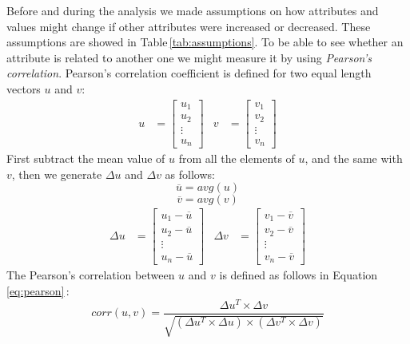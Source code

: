 \documentclass[USenglish]{uit-thesis}
\begin{document}
Before and during the analysis we made assumptions on how
attributes and values might change if other attributes were
increased or decreased. These assumptions are showed
in Table\,\ref{tab:assumptions}. To be able to see whether
an attribute is related to another one we might
measure it by using \emph{Pearson's correlation}.
Pearson's correlation coefficient is defined for two equal
length vectors $u$ and $v$:
\begin{align}
u &= \begin{bmatrix}
u_{1} \\
u_{2} \\
\vdots \\
u_{n}
\end{bmatrix} &
v &= \begin{bmatrix}
v_{1}\\
v_{2}\\
\vdots\\
v_{n}
\end{bmatrix}
\end{align}
First subtract the mean value of $u$ from all the elements of $u$, and the same with $v$, then we generate $\Delta{u}$ and $\Delta{v}$ as follows:
\[
\overline{u} = avg(u)
\]
\[
\overline{v} = avg(v)
\]
\begin{align}
\Delta{u} &=\begin{bmatrix}
u_{1} - \overline{u}\\
u_{2} - \overline{u}\\
\vdots\\
u_{n} - \overline{u}
\end{bmatrix} &
\Delta{v} &=\begin{bmatrix}
v_{1} - \overline{v}\\
v_{2} - \overline{v}\\
\vdots\\
v_{n} - \overline{v}
\end{bmatrix} 
\end{align}
The Pearson's correlation between $u$ and $v$ is defined as follows
in Equation\,\ref{eq:pearson}\,\cite{bowles2015machine}:
\begin{equation}
\label{eq:pearson}
corr(u,v) = \frac{\Delta{u^{T}} \times \Delta{v}}{\sqrt{(\Delta{u^{T}}\times \Delta{u})\times (\Delta{v^{T}}\times \Delta{v})}}
\end{equation}
\end{document}
